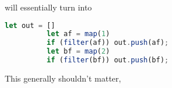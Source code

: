 \begin{enumerate}
        will essentially turn into 

        \begin{lstlisting}[language=JavaScript]
          let out = []
          let af = map(1)
          if (filter(af)) out.push(af);
          let bf = map(2)
          if (filter(bf)) out.push(bf);
        \end{lstlisting}                

        This generally shouldn't matter,      
    \end{enumerate}